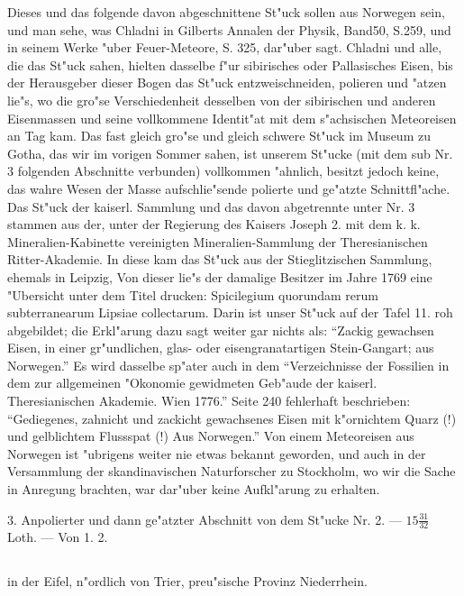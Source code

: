 \documentclass[a4paper, 11pt, oneside, polutonikogreek, german]{article}
\begin{document}
{\footnotesize Dieses und das folgende davon abgeschnittene St"uck sollen aus Norwegen sein, und man sehe, was Chladni in Gilberts Annalen der Physik, Band50, S.259, und in seinem Werke "uber Feuer-Meteore, S. 325, dar"uber sagt. Chladni und alle, die das St"uck sahen, hielten dasselbe f"ur sibirisches oder Pallasisches Eisen, bis der Herausgeber dieser Bogen das St"uck entzweischneiden, polieren und "atzen lie"s, wo die gro"se Verschiedenheit desselben von der sibirischen und anderen Eisenmassen und seine vollkommene Identit"at mit dem s"achsischen Meteoreisen an Tag kam. Das fast gleich gro"se und gleich schwere St"uck im Museum zu Gotha, das wir im vorigen Sommer sahen, ist unserem St"ucke (mit dem sub Nr. 3 folgenden Abschnitte verbunden) vollkommen "ahnlich, besitzt jedoch keine, das wahre Wesen der Masse aufschlie"sende polierte und ge"atzte Schnittfl"ache. Das St"uck der kaiserl. Sammlung und das davon abgetrennte unter Nr. 3 stammen aus der, unter der Regierung des Kaisers Joseph 2. mit dem k. k. Mineralien-Kabinette vereinigten Mineralien-Sammlung der Theresianischen Ritter-Akademie. In diese kam das St"uck aus der Stieglitzischen Sammlung, ehemals in Leipzig, Von dieser lie"s der damalige Besitzer im Jahre 1769 eine "Ubersicht unter dem Titel drucken: Spicilegium quorundam rerum subterranearum Lipsiae collectarum. Darin ist unser St"uck auf der Tafel 11. roh abgebildet; die Erkl"arung dazu sagt weiter gar nichts als: "`Zackig gewachsen Eisen, in einer gr"undlichen, glas- oder eisengranatartigen Stein-Gangart; aus Norwegen."' Es wird dasselbe sp"ater auch in dem "`Verzeichnisse der Fossilien in dem zur allgemeinen "Okonomie gewidmeten Geb"aude der kaiserl. Theresianischen Akademie. Wien 1776."' Seite 240 fehlerhaft beschrieben: "`Gediegenes, zahnicht und zackicht gewachsenes Eisen mit k"ornichtem Quarz (!) und gelblichtem Flussspat (!) Aus Norwegen."' Von einem Meteoreisen aus Norwegen ist "ubrigens weiter nie etwas bekannt geworden, und auch in der Versammlung der skandinavischen Naturforscher zu Stockholm, wo wir die Sache in Anregung brachten, war dar"uber keine Aufkl"arung zu erhalten.}

\setlength{\leftskip}{0pt}
\setlength{\parindent}{20pt}

3. Anpolierter und dann ge"atzter Abschnitt von dem St"ucke Nr. 2. --- $\mathfrak{15\frac{31}{32}}$ Loth. --- Von 1. 2.
\subsection[\swabfamily {Bitburg.}]{}
\begin{center}

in der Eifel, n"ordlich von Trier, preu"sische Provinz Niederrhein.
\end{center}
\end{document}
